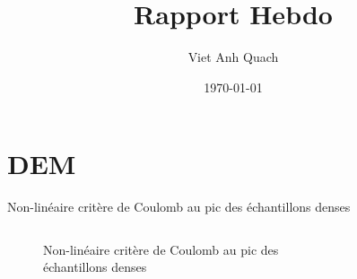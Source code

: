 \documentclass[10pt]{beamer}
\title{Rapport Hebdo}
\author{Viet Anh Quach}
\institute{3SR}
\date{\today}
\begin{document}
\begin{frame}
    \titlepage
\end{frame}


\section{DEM}

\begin{frame}{Non-linéaire critère de Coulomb au pic des échantillons denses}
    \begin{columns}
        \begin{column}{0.5\textwidth}
            \begin{figure}[h]
                \centering
                \caption{Non-linéaire critère de Coulomb au pic des échantillons denses}
            \end{figure}
        \end{column}
        \begin{column}{0.5\textwidth}
            \begin{figure}[h]
                \centering

\end{figure}
\end{column}
\end{columns}
\end{frame}
\end{document}
